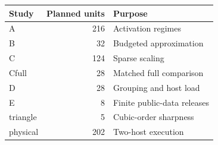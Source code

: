 \begin{tabular}{lrl}
\hline
Study & Planned units & Purpose \\
\hline
A & 216 & Activation regimes \\
B & 32 & Budgeted approximation \\
C & 124 & Sparse scaling \\
Cfull & 28 & Matched full comparison \\
D & 28 & Grouping and host load \\
E & 8 & Finite public-data releases \\
triangle & 5 & Cubic-order sharpness \\
physical & 202 & Two-host execution \\
\hline
\end{tabular}
